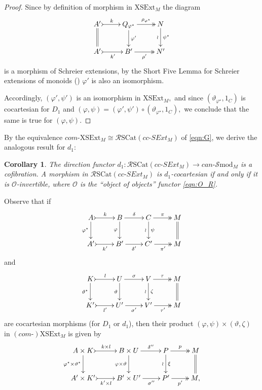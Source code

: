 \documentclass[a4paper]{amsart}
\theoremstyle{plain}
\newtheorem{corollary}[subsection]{Corollary}
\theoremstyle{definition}
\theoremstyle{remark}
\begin{document}
\begin{proof}
Since by definition of morphism in $\mathrm{XSExt}_M$ the diagram
\begin{equation*}
\xymatrix{
{A'} \ar@{>->}[r]^-{k} \ar@{=}[d] &{Q_{\varphi^\star}} \ar@{->>}[r]^-{\rho_{\varphi^\star}} \ar[d]^-{\varphi'} &{N} \ar[d]_-{\wr}^-{\psi^\star}\\
{A'} \ar@{>->}[r]_-{k'} &{B'} \ar@{->>}[r]_-{\rho'} &{N'}
}
\end{equation*}
is a morphism of Schreier extensions, by the Short Five Lemma for Schreier extensions of monoids (\cite[Proposition 4.5]{P-II}) $\varphi'$ is also an isomorphism.

Accordingly, $(\varphi',\psi')$ is an isomorphism in $\mathrm{XSExt}_M,$ and since $(\vartheta_{\varphi^\star},1_C)$ is cocartesian for $D_1$ and $(\varphi,\psi)=(\varphi',\psi')\circ(\vartheta_{\varphi^\star},1_C),$ we conclude that the same is true for $(\varphi,\psi).$
\end{proof}
By the equivalence $com\text{-}\mathrm{XSExt}_M\cong \mathcal{R}\mathrm{SCat}(cc\text{-}SExt_M)$ of \eqref{eqn:G}, we derive the analogous result for $d_1$:
\begin{corollary}
The direction functor $d_1\colon\mathcal{R}\mathrm{SCat}(cc\text{-}SExt_M)\longrightarrow can\text{-}\mathcal{S}\mathrm{mod}_M$ is a cofibration. A morphism in $\mathcal{R}\mathrm{SCat}(cc\text{-}SExt_M)$ is $d_1$-cocartesian if and only if it is $\mathcal{O}$-invertible, where $\mathcal{O}$ is the ``object of objects'' functor \eqref{eqn:O_R}.
\end{corollary}
Observe that if
\begin{equation*}
\xymatrix{
A \ar@{>->}[r]^-k \ar[d]_-{\varphi^\star} &B \ar[r]^-{\delta} \ar[d]_-{\varphi} &C \ar@{->>}[r]^-{\pi} \ar[d]_-{\wr}^-{\psi} &M\ar@{=}[d]  \\
{A'} \ar@{>->}[r]_-{k'} &{B'} \ar[r]_-{\delta'} &{C'} \ar@{->>}[r]_-{\pi'} &M
}
\end{equation*}
and
\begin{equation*}
\xymatrix{
K \ar@{>->}[r]^-l \ar[d]_-{\vartheta^\star} &U \ar[r]^-{\sigma} \ar[d]_-{\vartheta} &V \ar@{->>}[r]^-{\tau} \ar[d]_-{\wr}^-{\zeta} &M\ar@{=}[d]  \\
{K'} \ar@{>->}[r]_-{l'} &{U'} \ar[r]_-{\sigma'} &{V'} \ar@{->>}[r]_-{\tau'} &M
}
\end{equation*}
are cocartesian morphisms (for $D_1$ or $d_1$), then their product $(\varphi,\psi)\times(\vartheta,\zeta)$ in $(com\text{-})\mathrm{XSExt}_M$ is given by
\begin{equation*}
\xymatrix{
{A\times K} \ar@{>->}[r]^-{k\times l} \ar[d]_-{\varphi^\star\times\vartheta^\star} &{B\times U} \ar[r]^-{\delta''} \ar[d]_-{\varphi\times\vartheta} &P \ar@{->>}[r]^-{p} \ar[d]_-{\wr}^-{\xi} &M\ar@{=}[d]  \\
{A'\times K'} \ar@{>->}[r]_-{k'\times l} &{B'\times U'} \ar[r]_-{\sigma''} &{P'} \ar@{->>}[r]_-{p'} &{M,}
}
\end{equation*}
\end{document}
